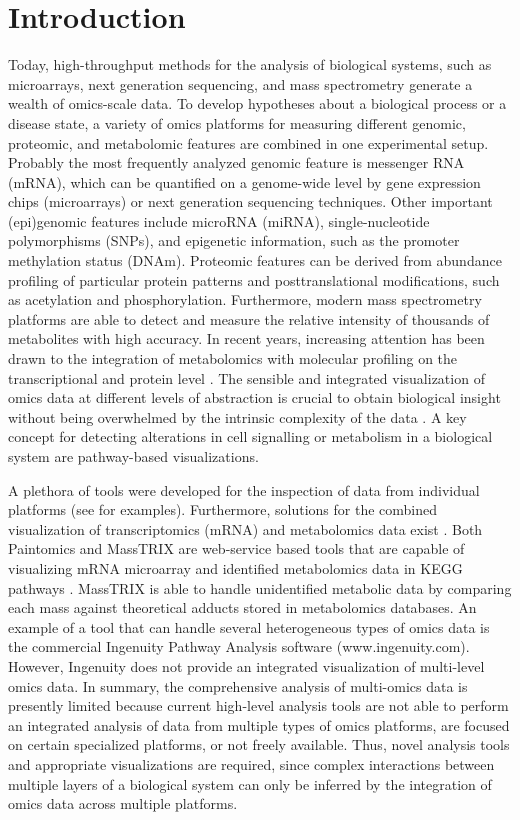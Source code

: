 \documentclass[final,5p,times,twocolumn]{elsarticle}
\newcommand\red[1]{{\color{red}#1}}
\begin{document}
\section{Introduction}
Today, high-throughput methods for the analysis of biological systems, such as microarrays, next generation sequencing, and mass spectrometry generate a wealth of omics-scale data. To develop hypotheses about a biological process or a disease state, a variety of omics platforms for measuring different genomic, proteomic, and metabolomic features are combined in one experimental setup. Probably the most frequently analyzed genomic feature is messenger RNA (mRNA), which can be quantified on a genome-wide level by gene expression chips (microarrays) or next generation sequencing techniques. Other important (epi)genomic features include microRNA (miRNA), single-nucleotide polymorphisms (SNPs), and epigenetic information, such as the promoter methylation status (DNAm). Proteomic features can be derived from abundance profiling of particular protein patterns and posttranslational modifications, such as acetylation and phosphorylation. Furthermore, modern mass spectrometry platforms are able to detect and measure 
the relative intensity of thousands of metabolites with high accuracy. \red{In recent years, increasing attention has been drawn to the integration of metabolomics with molecular profiling on the transcriptional and protein level \cite{Gruden2012, Amiour2012}.}
The sensible and integrated visualization of omics data at different levels of abstraction is crucial to obtain biological insight without being overwhelmed by the intrinsic complexity of the data \cite{Gehlenborg2010}. A key concept for detecting alterations in cell signalling or metabolism in a biological system are pathway-based visualizations.

A plethora of tools were developed for the inspection of data from individual platforms (see \cite{Gehlenborg2010} for examples). Furthermore, solutions for the combined visualization of transcriptomics (mRNA) and metabolomics data exist \cite{Garcia-Alcalde2011,Waegele2012}. Both Paintomics \cite{Garcia-Alcalde2011} and MassTRIX \cite{Waegele2012} are web-service based tools that are capable of visualizing mRNA microarray and identified metabolomics data in KEGG pathways \cite{Kanehisa2012}. MassTRIX is able to handle unidentified metabolic data by comparing each mass against theoretical adducts stored in metabolomics databases. An example of a tool that can handle several heterogeneous types of omics data is the commercial Ingenuity Pathway Analysis software (www.ingenuity.com). However, Ingenuity does not provide an integrated visualization of multi-level omics data. In summary, the comprehensive analysis of multi-omics data is presently limited because current high-level analysis tools are not able to 
perform an integrated analysis of data from multiple types of omics platforms, are focused on certain specialized platforms, or not freely available. Thus, novel analysis tools and appropriate visualizations are required, since complex interactions between multiple layers of a biological system can only be inferred by the integration of omics data across multiple platforms.
\end{document}
